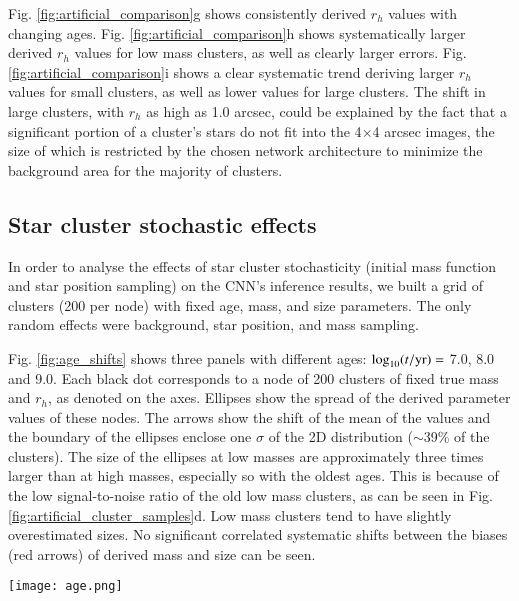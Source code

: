 \documentclass{aa}
\begin{document}
Fig. \ref{fig:artificial_comparison}g shows consistently derived $r_h$ values with changing ages. Fig. \ref{fig:artificial_comparison}h shows systematically larger derived $r_h$ values for low mass clusters, as well as clearly larger errors. Fig. \ref{fig:artificial_comparison}i shows a clear systematic trend deriving larger $r_h$ values for small clusters, as well as lower values for large clusters. The shift in large clusters, with $r_h$ as high as 1.0 arcsec, could be explained by the fact that a significant portion of a cluster's stars do not fit into the 4$\times$4 arcsec images, the size of which is restricted by the chosen network architecture to minimize the background area for the majority of clusters.

\subsection{Star cluster stochastic effects}
In order to analyse the effects of star cluster stochasticity (initial mass function and star position sampling) on the CNN's inference results, we built a grid of clusters (200 per node) with fixed age, mass, and size parameters. The only random effects were background, star position, and mass sampling.

Fig. \ref{fig:age_shifts} shows three panels with different ages: $\log_{10}(t/{\rm yr})=$ 7.0, 8.0 and 9.0. Each black dot corresponds to a node of 200 clusters of fixed true mass and $r_h$, as denoted on the axes. Ellipses show the spread of the derived parameter values of these nodes. The arrows show the shift of the mean of the values and the boundary of the ellipses enclose one $\sigma$ of the 2D distribution ($\sim$39\% of the clusters). The size of the ellipses at low masses are approximately three times larger than at high masses, especially so with the oldest ages. This is because of the low signal-to-noise ratio of the old low mass clusters, as can be seen in Fig. \ref{fig:artificial_cluster_samples}d. Low mass clusters tend to have slightly overestimated sizes. No significant correlated systematic shifts between the biases (red arrows) of derived mass and size can be seen.

\begin{figure*}
    \centering
    \texttt{[image: age.png]}
    \caption{Tests results of CNN performance. Each black dot corresponds to the true parameters of 200 artificial clusters. The gray ellipses enclose one $\sigma$ of the inferred values (accuracy), with the red arrows pointing to the means of the distributions (biases). The panels show mass vs. $r_h$ for three different ages.}
    \label{fig:age_shifts}
\end{figure*}
\end{document}
